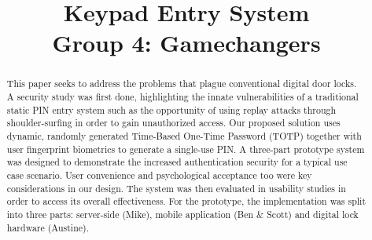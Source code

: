 \documentclass[conference]{IEEEtran}
\begin{document}
\title{Keypad Entry System\\
Group 4: Gamechangers
}

\author{
\and
{}
\and
{}
\and
{}
}

\maketitle

\begin{abstract}
This paper seeks to address the problems that plague conventional digital door locks. A security study was first done, highlighting the innate vulnerabilities of a traditional static PIN entry system such as the opportunity of using replay attacks through shoulder-surfing in order to gain unauthorized access. Our proposed solution uses dynamic, randomly generated Time-Based One-Time Password (TOTP) together with user fingerprint biometrics to generate a single-use PIN. A three-part prototype system was designed to demonstrate the increased authentication security for a typical use case scenario. User convenience and psychological acceptance too were key considerations in our design. The system was then evaluated in usability studies in order to access its overall effectiveness. For the prototype, the implementation was split into three parts: server-side (Mike), mobile application (Ben & Scott) and digital lock hardware (Austine).
\end{abstract}
\end{document}
